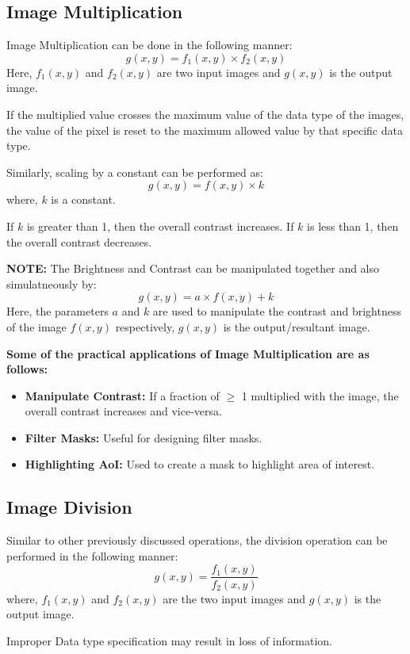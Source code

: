\subsection{Image Multiplication}

Image Multiplication can be done in the following manner:
$$g(x,y) = f_1(x,y) \times f_2(x,y)$$
Here, $f_1(x,y)$ and $f_2(x,y)$ are two input images and $g(x,y)$ is the output image.

If the multiplied value crosses the maximum value of the data type of the images, the value of the pixel is reset to the maximum allowed value by that specific data type.

Similarly, scaling by a constant can be performed as:
$$g(x,y) = f(x,y) \times k$$
where, $k$ is a constant.

If $k$ is greater than 1, then the overall contrast increases.
If $k$ is less than 1, then the overall contrast decreases.


\textbf{NOTE:} The Brightness and Contrast can be manipulated together and also simulatneously by:
$$g(x,y) = a \times f(x,y) + k$$
Here, the parameters $a$ and $k$ are used to manipulate the contrast and brightness of the image $f(x,y)$ respectively, $g(x,y)$ is the output/resultant image.

\textbf{Some of the practical applications of Image Multiplication are as follows:}
\begin{itemize}
    \item \textbf{Manipulate Contrast:} If a fraction of $\geqslant$ 1 multiplied with the image, the overall contrast increases and vice-versa.
    \item \textbf{Filter Masks:} Useful for designing filter masks.
    \item \textbf{Highlighting AoI:} Used to create a mask to highlight area of interest.
\end{itemize}

\subsection{Image Division}

Similar to other previously discussed operations, the division operation can be performed in the following manner:
$$g(x,y) = \frac{f_1(x,y)}{f_2(x,y)}$$
where, $f_1(x,y)$ and $f_2(x,y)$ are the two input images and $g(x,y)$ is the output image.

Improper Data type specification may result in loss of information.

